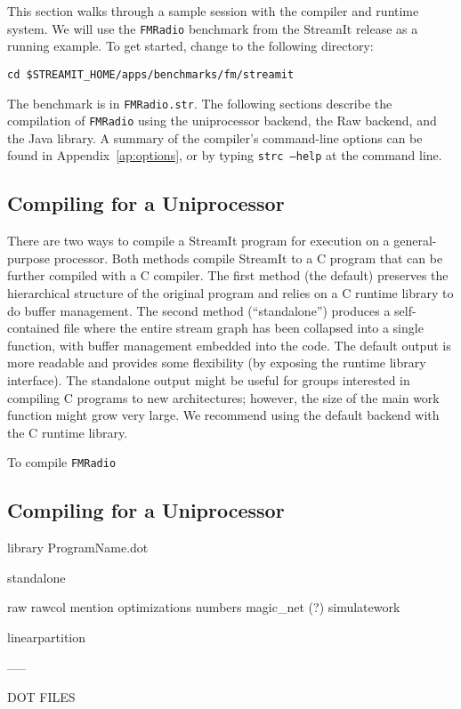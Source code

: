 This section walks through a sample session with the compiler and
runtime system.  We will use the {\tt FMRadio} benchmark from the
StreamIt release as a running example.  To get started, change to the
following directory:
\begin{verbatim}
cd $STREAMIT_HOME/apps/benchmarks/fm/streamit
\end{verbatim}
\noindent The benchmark is in {\tt FMRadio.str}. The following
sections describe the compilation of {\tt FMRadio} using the
uniprocessor backend, the Raw backend, and the Java library.  A
summary of the compiler's command-line options can be found in
Appendix~\ref{ap:options}, or by typing {\tt strc --help} at the
command line.

\subsection{Compiling for a Uniprocessor}

There are two ways to compile a StreamIt program for execution on a
general-purpose processor.  Both methods compile StreamIt to a C
program that can be further compiled with a C compiler.  The first
method (the default) preserves the hierarchical structure of the
original program and relies on a C runtime library to do buffer
management.  The second method (``standalone'') produces a
self-contained file where the entire stream graph has been collapsed
into a single function, with buffer management embedded into the code.
The default output is more readable and provides some flexibility (by
exposing the runtime library interface).  The standalone output might
be useful for groups interested in compiling C programs to new
architectures; however, the size of the main work function might grow
very large.  We recommend using the default backend with the C runtime
library.

To compile {\tt FMRadio} 


\subsection{Compiling for a Uniprocessor}


library
 ProgramName.dot

standalone

raw
rawcol
mention optimizations
numbers
magic\_net (?)
simulatework

linearpartition

-----

DOT FILES

